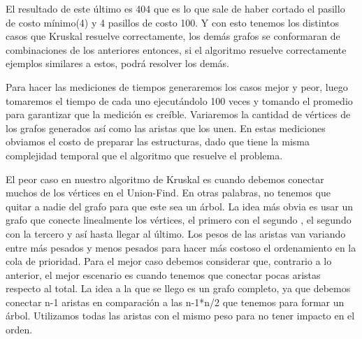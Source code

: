 
El resultado de este último es 404 que es lo que sale de haber cortado el pasillo de costo mínimo(4) y 4 pasillos de costo 100. Y con esto tenemos los distintos casos que Kruskal
resuelve correctamente, los demás grafos se conformaran de combinaciones de los anteriores entonces, si el algoritmo resuelve correctamente ejemplos similares a estos, 
podrá resolver los demás.
 

Para hacer las mediciones de tiempos generaremos los casos mejor y peor, luego tomaremos el tiempo de cada uno ejecutándolo 100 veces y tomando el promedio para 
garantizar que la medición es creíble. Variaremos la cantidad de vértices de los grafos generados así como las aristas que los unen. En estas mediciones obviamos el costo de preparar las estructuras, dado que tiene la misma complejidad temporal que el algoritmo que resuelve el problema.

El peor caso en nuestro algoritmo de Kruskal es cuando debemos conectar muchos de los vértices en el Union-Find. En otras palabras, no tenemos que quitar a nadie del grafo
para que este sea un árbol. La idea más obvia es usar un grafo que conecte linealmente los vértices, el primero con el segundo , el segundo con la tercero y así hasta
llegar al último. Los pesos de las aristas van variando entre más pesados y menos pesados para hacer más costoso el ordenamiento en la cola de prioridad. 
Para el mejor caso debemos considerar que, contrario a lo anterior, el mejor escenario es cuando tenemos que conectar pocas aristas respecto al total. La idea a la que se 
llego es un grafo completo, ya que debemos conectar n-1 aristas en comparación a las n-1*n/2 que tenemos para formar un árbol. Utilizamos todas las aristas con el mismo 
peso para no tener impacto en el orden.

